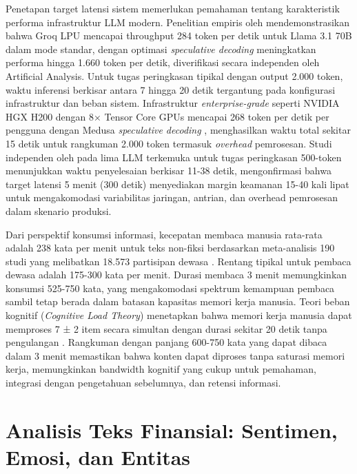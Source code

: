 Penetapan target latensi sistem memerlukan pemahaman tentang karakteristik performa infrastruktur LLM modern. Penelitian empiris oleh \textcite{groq2024} mendemonstrasikan bahwa Groq LPU mencapai throughput 284 token per detik untuk Llama 3.1 70B dalam mode standar, dengan optimasi \textit{speculative decoding} meningkatkan performa hingga 1.660 token per detik, diverifikasi secara independen oleh Artificial Analysis. Untuk tugas peringkasan tipikal dengan output 2.000 token, waktu inferensi berkisar antara 7 hingga 20 detik tergantung pada konfigurasi infrastruktur dan beban sistem. Infrastruktur \textit{enterprise-grade} seperti NVIDIA HGX H200 dengan 8× Tensor Core GPUs mencapai 268 token per detik per pengguna dengan Medusa \textit{speculative decoding} \autocite{nvidia2024}, menghasilkan waktu total sekitar 15 detik untuk rangkuman 2.000 token termasuk \textit{overhead} pemrosesan. Studi independen oleh \textcite{dilmegani2024} pada lima LLM terkemuka untuk tugas peringkasan 500-token menunjukkan waktu penyelesaian berkisar 11-38 detik, mengonfirmasi bahwa target latensi 5 menit (300 detik) menyediakan margin keamanan 15-40 kali lipat untuk mengakomodasi variabilitas jaringan, antrian, dan overhead pemrosesan dalam skenario produksi.

Dari perspektif konsumsi informasi, kecepatan membaca manusia rata-rata adalah 238 kata per menit untuk teks non-fiksi berdasarkan meta-analisis 190 studi yang melibatkan 18.573 partisipan dewasa \autocite{brysbaert2019}. Rentang tipikal untuk pembaca dewasa adalah 175-300 kata per menit. Durasi membaca 3 menit memungkinkan konsumsi 525-750 kata, yang mengakomodasi spektrum kemampuan pembaca sambil tetap berada dalam batasan kapasitas memori kerja manusia. Teori beban kognitif (\textit{Cognitive Load Theory}) menetapkan bahwa memori kerja manusia dapat memproses 7 ± 2 item secara simultan dengan durasi sekitar 20 detik tanpa pengulangan \autocite{cowan2001}. Rangkuman dengan panjang 600-750 kata yang dapat dibaca dalam 3 menit memastikan bahwa konten dapat diproses tanpa saturasi memori kerja, memungkinkan bandwidth kognitif yang cukup untuk pemahaman, integrasi dengan pengetahuan sebelumnya, dan retensi informasi.


\section{Analisis Teks Finansial: Sentimen, Emosi, dan Entitas}
\label{sec:financial-text-analysis}

